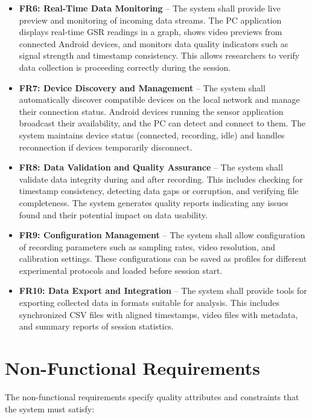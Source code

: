 \begin{itemize}
\item \textbf{FR6: Real-Time Data Monitoring} -- The system shall provide live preview and monitoring of incoming data streams. The PC application displays real-time GSR readings in a graph, shows video previews from connected Android devices, and monitors data quality indicators such as signal strength and timestamp consistency. This allows researchers to verify data collection is proceeding correctly during the session.

\item \textbf{FR7: Device Discovery and Management} -- The system shall automatically discover compatible devices on the local network and manage their connection status. Android devices running the sensor application broadcast their availability, and the PC can detect and connect to them. The system maintains device status (connected, recording, idle) and handles reconnection if devices temporarily disconnect.

\item \textbf{FR8: Data Validation and Quality Assurance} -- The system shall validate data integrity during and after recording. This includes checking for timestamp consistency, detecting data gaps or corruption, and verifying file completeness. The system generates quality reports indicating any issues found and their potential impact on data usability.

\item \textbf{FR9: Configuration Management} -- The system shall allow configuration of recording parameters such as sampling rates, video resolution, and calibration settings. These configurations can be saved as profiles for different experimental protocols and loaded before session start.

\item \textbf{FR10: Data Export and Integration} -- The system shall provide tools for exporting collected data in formats suitable for analysis. This includes synchronized CSV files with aligned timestamps, video files with metadata, and summary reports of session statistics.
\end{itemize}

\section{Non-Functional Requirements}

The non-functional requirements specify quality attributes and constraints that the system must satisfy:

